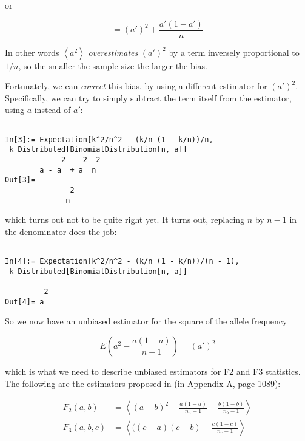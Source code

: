 \documentclass{article}
\begin{document}
or

\begin{equation}
=\left(a'\right)^2+\frac{a'(1-a')}{n}
\end{equation}

In other words \(\left\langle a^2\right\rangle\) \textit{overestimates} \((a')^2\) by a term inversely proportional to \(1/n\), so the smaller the sample size the larger the bias.

Fortunately, we can \textit{correct} this bias, by using a different estimator for \((a')^2\). Specifically, we can try to simply subtract the term itself from the estimator, using \(a\) instead of \(a'\):

\begin{lstlisting}

In[3]:= Expectation[k^2/n^2 - (k/n (1 - k/n))/n,
 k Distributed[BinomialDistribution[n, a]]   
             2    2  2
        a - a  + a  n
Out[3]= --------------
               2
              n
\end{lstlisting}

which turns out not to be quite right yet. It turns out, replacing \(n\) by \(n-1\) in the denominator does the job:

\begin{lstlisting}

In[4]:= Expectation[k^2/n^2 - (k/n (1 - k/n))/(n - 1),                          
 k Distributed[BinomialDistribution[n, a]]                                   

         2
Out[4]= a
\end{lstlisting}

So we now have an unbiased estimator for the square of the allele frequency

\begin{equation}
\label{eq_freqSquare_unbiased}
E\left( a^2-\frac{a(1-a)}{n-1}\right) =\left(a'\right)^2
\end{equation}

which is what we need to describe unbiased estimators for F2 and F3 statistics. The following are the estimators proposed in \cite{Patterson2012-yq} (in Appendix A, page 1089):

\begin{align}
F_2(a,b) &= \left\langle (a-b)^2-\frac{a(1-a)}{n_a-1}-\frac{b(1-b)}{n_b-1}\right\rangle \\
F_3(a,b,c) &= \left\langle( (c-a)(c-b)-\frac{c(1-c)}{n_c-1}\right\rangle
\end{align}
\end{document}

